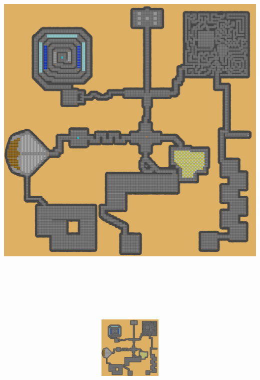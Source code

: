 \documentclass[a4paper, landscape]{article}
\begin{document}
\includegraphics[trim = 1184 3450 3103 1020, clip, height = 19cm, width = 28cm]{Dungeon_playersmap.png}
\clearpage
	\begin{figure}
\includegraphics[trim = 403 3350 3884 1620, clip, height = 3cm, width = 28cm]{Dungeon_playersmap.png}
	\end{figure}
\end{document}
